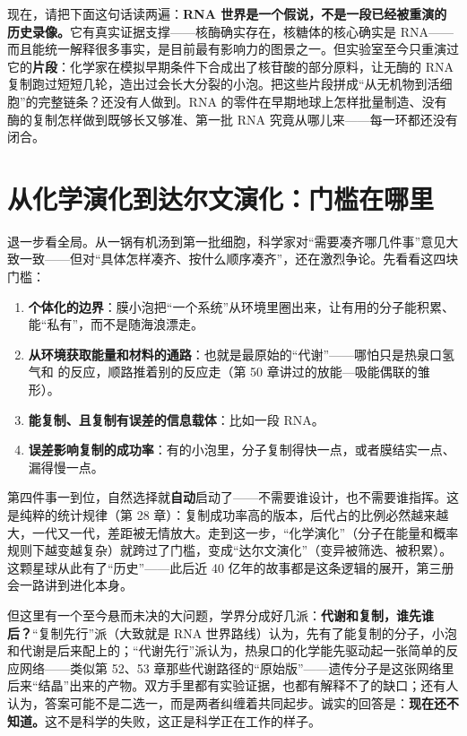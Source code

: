 现在，请把下面这句话读两遍：\textbf{RNA 世界是一个假说，不是一段已经被重演的历史录像。}它有真实证据支撑——核酶确实存在，核糖体的核心确实是 RNA——而且能统一解释很多事实，是目前最有影响力的图景之一。但实验室至今只重演过它的\textbf{片段}：化学家在模拟早期条件下合成出了核苷酸的部分原料，让无酶的 RNA 复制跑过短短几轮，造出过会长大分裂的小泡。把这些片段拼成“从无机物到活细胞”的完整链条？还没有人做到。RNA 的零件在早期地球上怎样批量制造、没有酶的复制怎样做到既够长又够准、第一批 RNA 究竟从哪儿来——每一环都还没有闭合。

\section{从化学演化到达尔文演化：门槛在哪里}

退一步看全局。从一锅有机汤到第一批细胞，科学家对“需要凑齐哪几件事”意见大致一致——但对“具体怎样凑齐、按什么顺序凑齐”，还在激烈争论。先看看这四块门槛：

\begin{enumerate}[itemsep=2pt]
\item \textbf{个体化的边界}：膜小泡把“一个系统”从环境里圈出来，让有用的分子能积累、能“私有”，而不是随海浪漂走。
\item \textbf{从环境获取能量和材料的通路}：也就是最原始的“代谢”——哪怕只是热泉口氢气和  的反应，顺路推着别的反应走（第 50 章讲过的放能—吸能偶联的雏形）。
\item \textbf{能复制、且复制有误差的信息载体}：比如一段 RNA。
\item \textbf{误差影响复制的成功率}：有的小泡里，分子复制得快一点，或者膜结实一点、漏得慢一点。
\end{enumerate}

第四件事一到位，自然选择就\textbf{自动}启动了——不需要谁设计，也不需要谁指挥。这是纯粹的统计规律（第 28 章）：复制成功率高的版本，后代占的比例必然越来越大，一代又一代，差距被无情放大。走到这一步，“化学演化”（分子在能量和概率规则下越变越复杂）就跨过了门槛，变成“达尔文演化”（变异被筛选、被积累）。这颗星球从此有了“历史”——此后近 40 亿年的故事都是这条逻辑的展开，第三册会一路讲到进化本身。

但这里有一个至今悬而未决的大问题，学界分成好几派：\textbf{代谢和复制，谁先谁后？}“复制先行”派（大致就是 RNA 世界路线）认为，先有了能复制的分子，小泡和代谢是后来配上的；“代谢先行”派认为，热泉口的化学能先驱动起一张简单的反应网络——类似第 52、53 章那些代谢路径的“原始版”——遗传分子是这张网络里后来“结晶”出来的产物。双方手里都有实验证据，也都有解释不了的缺口；还有人认为，答案可能不是二选一，而是两者纠缠着共同起步。诚实的回答是：\textbf{现在还不知道。}这不是科学的失败，这正是科学正在工作的样子。

